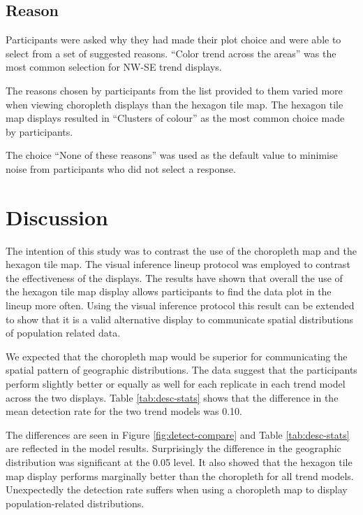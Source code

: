 \documentclass[times, doublespace]{anzsauth}
\begin{document}
\subsection{Reason}\label{reason}

Participants were asked why they had made their plot choice and were
able to select from a set of suggested reasons. ``Color trend across the
areas'' was the most common selection for NW-SE trend displays.

The reasons chosen by participants from the list provided to them varied
more when viewing choropleth displays than the hexagon tile map. The
hexagon tile map displays resulted in ``Clusters of colour'' as the most
common choice made by participants.

The choice ``None of these reasons'' was used as the default value to
minimise noise from participants who did not select a response.

\section{Discussion}\label{discussion}

The intention of this study was to contrast the use of the choropleth
map and the hexagon tile map. The visual inference lineup protocol was
employed to contrast the effectiveness of the displays. The results have
shown that overall the use of the hexagon tile map display allows
participants to find the data plot in the lineup more often. Using the
visual inference protocol this result can be extended to show that it is
a valid alternative display to communicate spatial distributions of
population related data.

We expected that the choropleth map would be superior for communicating
the spatial pattern of geographic distributions. The data suggest that
the participants perform slightly better or equally as well for each
replicate in each trend model across the two displays. Table \ref{tab:desc-stats} shows
that the difference in the mean detection rate for the two trend models
was 0.10.

The differences are seen in Figure \ref{fig:detect-compare} and Table
\ref{tab:desc-stats} are reflected in the model results. Surprisingly
the difference in the geographic distribution was significant at the
0.05 level. It also showed that the hexagon tile map display performs
marginally better than the choropleth for all trend models. Unexpectedly
the detection rate suffers when using a choropleth map to display
population-related distributions.
\end{document}
